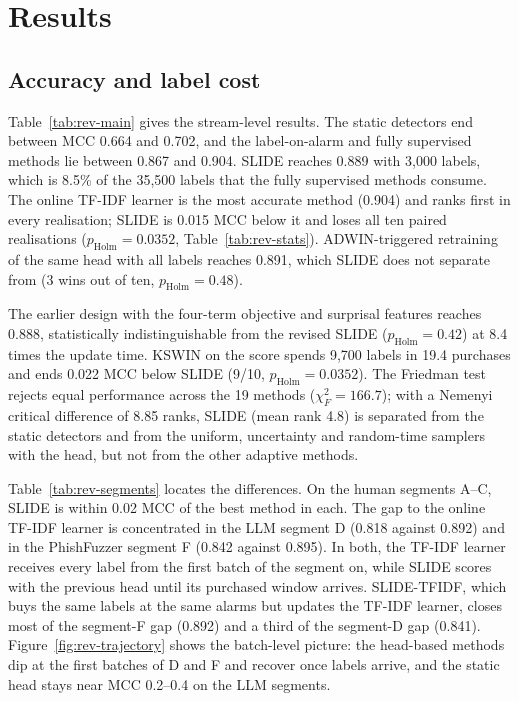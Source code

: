\section{Results}\label{sec:results}

\subsection{Accuracy and label cost}\label{sec:main}
Table~\ref{tab:rev-main} gives the stream-level results. The static detectors end between MCC 0.664 and 0.702, and the label-on-alarm and fully supervised methods lie between 0.867 and 0.904. SLIDE reaches 0.889 with 3{,}000 labels, which is 8.5\% of the 35{,}500 labels that the fully supervised methods consume. The online TF-IDF learner is the most accurate method (0.904) and ranks first in every realisation; SLIDE is 0.015 MCC below it and loses all ten paired realisations ($p_{\mathrm{Holm}}=0.0352$, Table~\ref{tab:rev-stats}). ADWIN-triggered retraining of the same head with all labels reaches 0.891, which SLIDE does not separate from (3 wins out of ten, $p_{\mathrm{Holm}}=0.48$).



The earlier design with the four-term objective and surprisal features reaches 0.888, statistically indistinguishable from the revised SLIDE ($p_{\mathrm{Holm}}=0.42$) at 8.4 times the update time. KSWIN on the score spends 9{,}700 labels in 19.4 purchases and ends 0.022 MCC below SLIDE (9/10, $p_{\mathrm{Holm}}=0.0352$). The Friedman test rejects equal performance across the 19 methods ($\chi^2_F=166.7$); with a Nemenyi critical difference of 8.85 ranks, SLIDE (mean rank 4.8) is separated from the static detectors and from the uniform, uncertainty and random-time samplers with the head, but not from the other adaptive methods.



Table~\ref{tab:rev-segments} locates the differences. On the human segments A--C, SLIDE is within 0.02 MCC of the best method in each. The gap to the online TF-IDF learner is concentrated in the LLM segment D (0.818 against 0.892) and in the PhishFuzzer segment F (0.842 against 0.895). In both, the TF-IDF learner receives every label from the first batch of the segment on, while SLIDE scores with the previous head until its purchased window arrives. SLIDE-TFIDF, which buys the same labels at the same alarms but updates the TF-IDF learner, closes most of the segment-F gap (0.892) and a third of the segment-D gap (0.841). Figure~\ref{fig:rev-trajectory} shows the batch-level picture: the head-based methods dip at the first batches of D and F and recover once labels arrive, and the static head stays near MCC 0.2--0.4 on the LLM segments.

